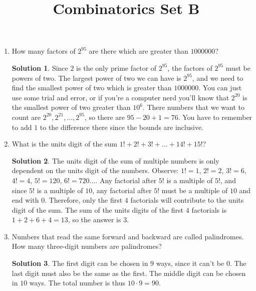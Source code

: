 \documentclass{article}
\title{Combinatorics Set B}
\author{}
\date{}
\theoremstyle{definition}
\newtheorem*{solution}{Solution}
\begin{document}
\maketitle
\begin{enumerate}
    \item How many factors of $2^{95}$ are there which are greater than 
        $\num{1000000}$?
        \begin{solution}
            Since $2$ is the only prime factor of $2^{95}$, the factors of 
            $2^{95}$ must be powers of two. The largest power of two we can have 
            is $2^{95}$, and we need to find the smallest power of two which is 
            greater than $\num{1000000}$. You can just use some trial and error, 
            or if you're a computer nerd you'll know that $2^{20}$ is the 
            smallest power of two greater than $10^6$. There numbers that we 
            want to count are $2^{20}, 2^{21}, \dots, 2^{95}$, so there are $95 
            - 20 + 1 = 76$. You have to remember to add $1$ to the difference 
            there since the bounds are inclusive.
        \end{solution}
    \item What is the units digit of the sum $1! + 2! + 3! + \dots + 14! + 15!$?
        \begin{solution}
            The units digit of the sum of multiple numbers is only dependent on 
            the units digit of the numbers. Observe: $1! = 1$, $2! = 2$, $3! = 
            6$, $4! = 4$, $5! = 120$, $6! = 720 \dots$. Any factorial after $5!$ 
            is a multiple of $5!$, and since $5!$ is a multiple of $10$, any 
            factorial after $5!$ must be a multiple of $10$ and end with $0$. 
            Therefore, only the first $4$ factorials will contribute to the 
            units digit of the sum. The sum of the units digits of the first $4$ 
            factorials is $1 + 2 + 6 + 4 = 13$, so the answer is $3$.
        \end{solution}
    \item Numbers that read the same forward and backward are called 
        palindromes. How many three-digit numbers are palindromes?
        \begin{solution}
            The first digit can be chosen in $9$ ways, since it can't be $0$. 
            The last digit must also be the same as the first. The middle digit 
            can be chosen in $10$ ways. The total number is thus $10 \cdot 9 = 
            90$.
        \end{solution}

\end{enumerate}
\end{document}
